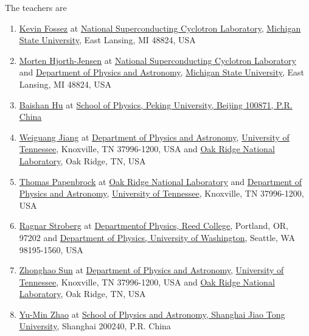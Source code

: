 \documentclass[%
oneside,                 %
final,                   %
10pt]{article}
\begin{document}
The teachers are 
\begin{enumerate}
\item \href{{https://loop.frontiersin.org/people/519268/overview}}{Kevin Fossez} at \href{{http://www.nscl.msu.edu/}}{National Superconducting Cyclotron Laboratory},  \href{{http://www.msu.edu/}}{Michigan State University}, East Lansing, MI 48824, USA

\item \href{{http://mhjgit.github.io/info/doc/web/}}{Morten Hjorth-Jensen}  at \href{{http://www.nscl.msu.edu/}}{National Superconducting Cyclotron Laboratory} and \href{{https://www.pa.msu.edu/}}{Department of Physics and Astronomy}, \href{{http://www.msu.edu/}}{Michigan State University}, East Lansing, MI 48824, USA

\item \href{{http://www.phy.pku.edu.cn/~frxu/people.html}}{Baishan Hu} at \href{{http://english.pku.edu.cn/}}{School of Physics, Peking University, Beijing 100871, P.R. China}

\item \href{{https://www.researchgate.net/profile/Weiguang_Jiang2}}{Weiguang Jiang} at  \href{{https://www.phys.utk.edu/}}{Department of Physics and Astronomy}, \href{{http://www.utk.edu/}}{University of Tennessee}, Knoxville, TN 37996-1200, USA and \href{{http://www.ornl.gov/}}{Oak Ridge National Laboratory}, Oak Ridge, TN, USA

\item \href{{http://web.utk.edu/~tpapenbr/default.html}}{Thomas Papenbrock}  at \href{{http://www.ornl.gov/}}{Oak Ridge National Laboratory} and \href{{https://www.phys.utk.edu/}}{Department of Physics and Astronomy}, \href{{http://www.utk.edu/}}{University of Tennessee}, Knoxville, TN 37996-1200, USA

\item \href{{http://people.reed.edu/~rstroberg/}}{Ragnar Stroberg}  at \href{{http://www.reed.edu/}}{Departmentof Physics, Reed College}, Portland, OR, 97202 and \href{{https://sharepoint.washington.edu/phys/Pages/default.aspx}}{Department of Physics, University of Washington}, Seattle, WA 98195-1560, USA

\item \href{{http://volweb.utk.edu/~zsun20/}}{Zhonghao Sun} at \href{{https://www.phys.utk.edu/}}{Department of Physics and Astronomy}, \href{{http://www.utk.edu/}}{University of Tennessee}, Knoxville, TN 37996-1200, USA and \href{{http://www.ornl.gov/}}{Oak Ridge National Laboratory}, Oak Ridge, TN, USA

\item \href{{http://www.physics.sjtu.edu.cn/en/people/1/ymZhao}}{Yu-Min Zhao}  at \href{{http://www.physics.sjtu.edu.cn/en/about/news/3}}{School of Physics and Astronomy, Shanghai Jiao Tong University}, Shanghai 200240, P.R. China 
\end{enumerate}
\end{document}
